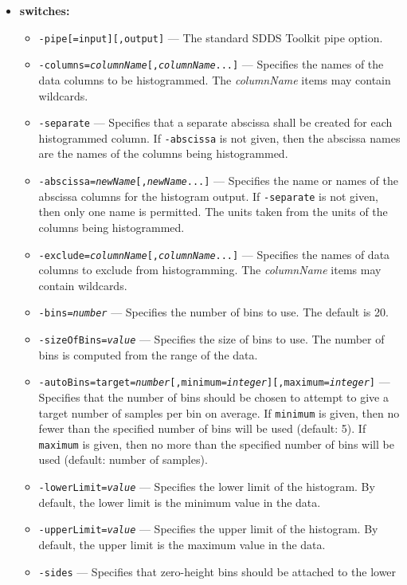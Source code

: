 \begin{itemize}
\item {\bf switches:}
    \begin{itemize}
    \item \verb|-pipe[=input][,output]| --- The standard SDDS Toolkit pipe option.
    \item {\tt -columns={\em columnName}[,{\em columnName}...]} --- Specifies the names
         of the data columns to be histogrammed.
        The {\em columnName} items may contain wildcards.
    \item {\tt -separate} --- Specifies that a separate abscissa shall be created for each histogrammed
        column.  If {\tt -abscissa} is not given, then the abscissa names are the names of the columns
        being histogrammed. 
    \item {\tt -abscissa={\em newName}[,{\em newName}...]} --- Specifies the name or names of the 
        abscissa columns for the histogram output.  If {\tt -separate} is not given, then only
        one name is permitted.
        The units taken from the units of the columns being histogrammed.
    \item {\tt -exclude={\em columnName}[,{\em columnName}...]} --- Specifies the names of data columns to
        exclude from histogramming.  The {\em columnName} items may contain wildcards.
    \item {\tt -bins={\em number}} --- Specifies the number of bins to use.  The default is 20.
    \item {\tt -sizeOfBins={\em value}} --- Specifies the size of bins to use.  The number of bins is
        computed from the range of the data.
    \item {\tt -autoBins=target={\em number}[,minimum={\em integer}][,maximum={\em integer}]} --- Specifies
      that the number of bins should be chosen to attempt to give a target number of samples per bin on average.
      If {\tt minimum} is given, then no fewer than the specified number of bins will be used (default: 5).
      If {\tt maximum} is given, then no more than the specified number of bins will be used (default: number of samples).
    \item {\tt -lowerLimit={\em value}} --- Specifies the lower limit of the histogram.  By default,
        the lower limit is the minimum value in the data.
    \item {\tt -upperLimit={\em value}} --- Specifies the upper limit of the histogram.  By default,
        the upper limit is the maximum value in the data.
    \item {\tt -sides} --- Specifies that zero-height bins should be attached to the lower

\end{itemize}
\end{itemize}
